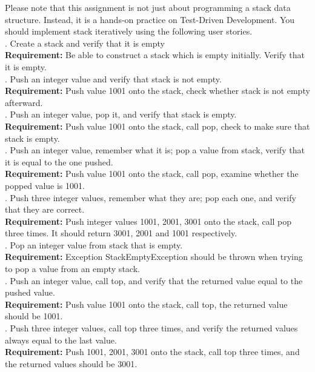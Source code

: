 \noindent Please note that this assignment is not just about programming a stack data structure. Instead, it is a hands-on practice on Test-Driven Development. You should implement stack iteratively using the following user stories.\\

. Create a stack and verify that it is empty\\
\textbf{Requirement:} Be able to construct a stack which is empty initially. Verify that it is empty.\\

. Push an integer value and verify that stack is not empty. \\
\textbf{Requirement:} Push value 1001 onto the stack, check whether stack is not empty afterward.\\

. Push an integer value, pop it, and verify that stack is empty. \\
\textbf{Requirement:} Push value 1001 onto the stack, call pop, check to make sure that stack is empty.\\

. Push an integer value, remember what it is; pop a value from stack, verify that it is equal to the one pushed. \\
\textbf{Requirement:} Push value 1001 onto the stack, call pop, examine whether the popped value is 1001.\\

. Push three integer values, remember what they are; pop each one, and verify that they are correct. \\
\textbf{Requirement:} Push integer values 1001, 2001, 3001 onto the stack, call pop three times. It should return 3001, 2001 and 1001 respectively.\\

. Pop an integer value from stack that is empty. \\
\textbf{Requirement:} Exception StackEmptyException should be thrown when trying to pop a value from an empty stack.\\

. Push an integer value, call top, and verify that the returned value equal to the pushed value. \\
\textbf{Requirement:} Push value 1001 onto the stack, call top, the returned value should be  1001.\\

. Push three integer values, call top three times, and verify the returned values always equal to the last value. \\
\textbf{Requirement:} Push 1001, 2001, 3001 onto the stack, call top three times, and the returned values should be 3001.\\


